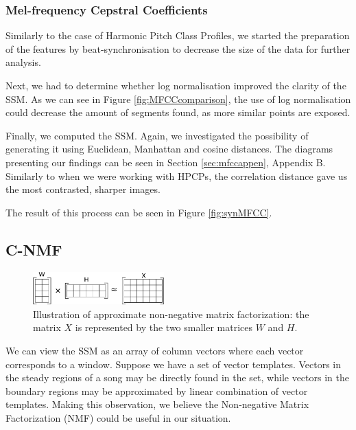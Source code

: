 \subsubsection*{Mel-frequency Cepstral Coefficients}


Similarly to the case of Harmonic Pitch Class Profiles, we started the preparation of the features by beat-synchronisation to decrease the size of the data for further analysis. 

Next, we had to determine whether log normalisation improved the clarity of the SSM. As we can see in Figure \ref{fig:MFCCcomparison}, the use of log normalisation could decrease the amount of segments found, as more similar points are exposed.

Finally, we computed the SSM. Again, we investigated the possibility of generating it using Euclidean, Manhattan and cosine distances. The diagrams presenting our findings can be seen in Section \ref{sec:mfccappen}, Appendix B. Similarly to when we were working with HPCPs, the correlation distance gave us the most contrasted, sharper images. 

The result of this process can be seen in Figure \ref{fig:synMFCC}.

\vspace{10pt}

\subsection{C-NMF}


\begin{figure}
\vspace{-20pt}
  \begin{center}
    \includegraphics[width=0.45\textwidth]{Figures/NMF}
  \end{center}
  \caption{Illustration of approximate non-negative matrix factorization: the matrix $X$ is represented by the two smaller matrices $W$ and $H$.}
\label{fig:NMF}
\end{figure}

We can view the SSM as an array of column vectors where each vector corresponds to a window. Suppose we have a set of vector templates. Vectors in the steady regions of a song may be directly found in the set, while vectors in the boundary regions may be approximated by linear combination of vector templates. Making this observation, we believe the Non-negative Matrix Factorization (NMF) could be useful in our situation.

